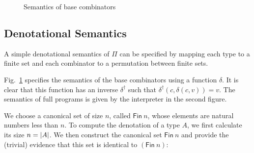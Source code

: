 \begin{figure}[t]
{}
\caption{Semantics of base combinators}\label{fig:delta}
\end{figure}

\subsection{Denotational Semantics}

\noindent A simple denotational semantics of $\Pi$ can be specified by mapping each type to a finite set and each
combinator to a permutation between finite sets.

Fig.~\ref{fig:delta} specifies the semantics of the base combinators
using a function $\delta$. It is clear that this function has an inverse $\delta^\dagger$ such that
$\delta^\dagger(c,\delta(c,v))=v$. The semantics of full programs is given by the interpreter in the second figure.

We choose a canonical set of size $n$, called $\mathsf{Fin}~n$, whose elements are natural numbers less than $n$. To
compute the denotation of a type $A$, we first calculate its size $n = | A |$. We then construct the canonical set
$\mathsf{Fin}~n$ and provide the (trivial) evidence that this set is identical to $(\mathsf{Fin}~n)$:

